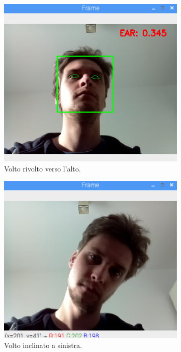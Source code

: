 \documentclass[12pt]{article}
\begin{document}
\begin{figure}[!htb]
\begin{subfigure}{.3\textwidth}
		\includegraphics[width=.8\linewidth]{eps/mp_upward_view.eps}
		\caption{Volto rivolto verso l'alto.}
	\end{subfigure}
	\par\bigskip %
	\begin{subfigure}{.3\textwidth}
		\centering
		\includegraphics[width=.8\linewidth]{eps/mp_left_tilted_view.eps}
		\caption{Volto inclinato a sinistra.}
	\end{subfigure}
	\hspace{5mm}
	\begin{subfigure}{.3\textwidth}
		\centering

\end{subfigure}
\end{figure}
\end{document}
